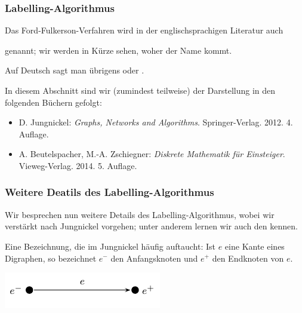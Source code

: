 \documentclass[smaller]{beamer}
\begin{document}
\begin{frame}
 \frametitle{Labelling-Algorithmus}
 Das Ford-Fulkerson-Verfahren wird in der englischsprachigen Literatur auch
\begin{center}
\end{center}
genannt; wir werden in Kürze sehen, woher der Name kommt. \\ \vspace*{0.2cm}

Auf Deutsch sagt man übrigens  oder . \\ \vspace*{0.2cm}

In diesem Abschnitt sind wir (zumindest teilweise) der Darstellung in den folgenden Büchern gefolgt:
\begin{itemize}
\item D. Jungnickel: \textit{Graphs, Networks and Algorithms}. Springer-Verlag. 2012. 4. Auflage.
\item A. Beutelspacher, M.-A. Zschiegner: \textit{Diskrete Mathematik für Einsteiger}. Vieweg-Verlag. 2014. 5. Auflage.
\end{itemize}
\end{frame}

\begin{frame}
 \frametitle{Weitere Deatils des Labelling-Algorithmus}
 \alert{Wir besprechen nun weitere Details des Labelling-Algorithmus}, wobei wir verstärkt nach Jungnickel vorgehen; unter anderem lernen wir auch den  kennen. \\ \vspace*{0.2cm}

Eine Bezeichnung, die im Jungnickel häufig auftaucht: Ist $e$ eine Kante eines Digraphen, so bezeichnet \alert{$e^-$ den Anfangsknoten} und \alert{$e^+$ den Endknoten von $e$}.
\begin{center}
 \includegraphics{fig20.pdf}
\end{center}

\end{frame}
\end{document}
